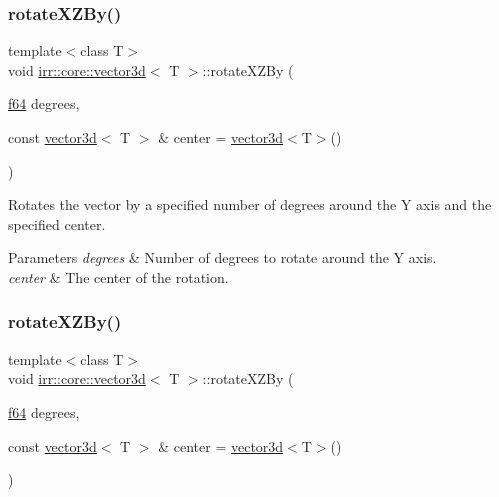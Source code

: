 \subsubsection{\texorpdfstring{rotate\+X\+Z\+By()}{rotateXZBy()}\hspace{0.1cm}{\footnotesize\ttfamily [1/2]}}
{\footnotesize\ttfamily template$<$class T$>$ \\
void \hyperlink{classirr_1_1core_1_1vector3d}{irr\+::core\+::vector3d}$<$ T $>$\+::rotate\+X\+Z\+By (\begin{DoxyParamCaption}\item[{\hyperlink{namespaceirr_a1325b02603ad449f92c68fc640af9b28}{f64}}]{degrees,  }\item[{const \hyperlink{classirr_1_1core_1_1vector3d}{vector3d}$<$ T $>$ \&}]{center = {\ttfamily \hyperlink{classirr_1_1core_1_1vector3d}{vector3d}$<$T$>$()} }\end{DoxyParamCaption})\hspace{0.3cm}{\ttfamily [inline]}}



Rotates the vector by a specified number of degrees around the Y axis and the specified center. 


\begin{DoxyParams}{Parameters}
{\em degrees} & Number of degrees to rotate around the Y axis. \\
\hline
{\em center} & The center of the rotation. \\
\hline
\end{DoxyParams}
\mbox{\label{classirr_1_1core_1_1vector3d_a621fbddb42814edd3d14410252cf7b7a}} 
\subsubsection{\texorpdfstring{rotate\+X\+Z\+By()}{rotateXZBy()}\hspace{0.1cm}{\footnotesize\ttfamily [2/2]}}
{\footnotesize\ttfamily template$<$class T$>$ \\
void \hyperlink{classirr_1_1core_1_1vector3d}{irr\+::core\+::vector3d}$<$ T $>$\+::rotate\+X\+Z\+By (\begin{DoxyParamCaption}\item[{\hyperlink{namespaceirr_a1325b02603ad449f92c68fc640af9b28}{f64}}]{degrees,  }\item[{const \hyperlink{classirr_1_1core_1_1vector3d}{vector3d}$<$ T $>$ \&}]{center = {\ttfamily \hyperlink{classirr_1_1core_1_1vector3d}{vector3d}$<$T$>$()} }\end{DoxyParamCaption})\hspace{0.3cm}{\ttfamily [inline]}}



